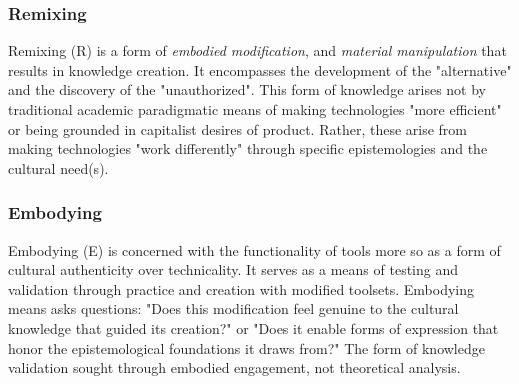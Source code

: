 \subsubsection{Remixing}
\noindent Remixing (R) is a form of \textit{embodied modification}, and \textit{material manipulation} that results in knowledge creation. It encompasses the development of the "alternative" and the discovery of the "unauthorized". This form of knowledge arises not by traditional academic paradigmatic means of making technologies "more efficient" or being grounded in capitalist desires of product. Rather, these arise from making technologies "work differently" through specific epistemologies and the cultural need(s).

\subsubsection{Embodying}
\noindent Embodying (E) is concerned with the functionality of tools more so as a form of cultural authenticity over technicality. It serves as a means of testing and validation through practice and creation with modified toolsets. Embodying means asks questions: "Does this modification feel genuine to the cultural knowledge that guided its creation?" or "Does it enable forms of expression that honor the epistemological foundations it draws from?" The form of knowledge validation sought through embodied engagement, not theoretical analysis.

